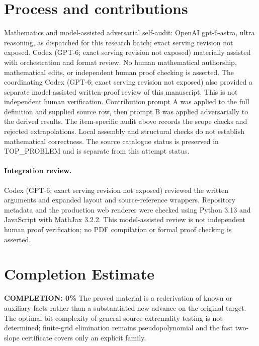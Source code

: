 \documentclass[11pt]{article}
\begin{document}
\section{Process and contributions}
Mathematics and model-assisted adversarial self-audit: OpenAI gpt-6-astra, ultra reasoning, as dispatched for this research batch; exact serving revision not exposed. Codex (GPT-6; exact serving revision not exposed) materially assisted with orchestration and format review. No human mathematical authorship, mathematical edits, or independent human proof checking is asserted.
The coordinating Codex (GPT-6; exact serving revision not exposed) also provided a separate model-assisted written-proof review of this manuscript. This is not independent human verification.
Contribution prompt A was applied to the full definition and supplied source row, then prompt B was applied adversarially to the derived results. The item-specific audit above records the scope checks and rejected extrapolations. Local assembly and structural checks do not establish mathematical correctness. The source catalogue status is preserved in TOP\_PROBLEM and is separate from this attempt status.
\paragraph{Integration review.} Codex (GPT-6; exact serving revision not exposed) reviewed the written arguments and expanded layout and source-reference wrappers. Repository metadata and the production web renderer were checked using Python 3.13 and JavaScript with MathJax 3.2.2. This model-assisted review is not independent human proof verification; no PDF compilation or formal proof checking is asserted.

\section{Completion Estimate}
\noindent\textbf{COMPLETION: 0\%}
The proved material is a rederivation of known or auxiliary facts rather than a substantiated new advance on the original target. The optimal bit complexity of general source extremality testing is not determined; finite-grid elimination remains pseudopolynomial and the fast two-slope certificate covers only an explicit family.
\end{document}
